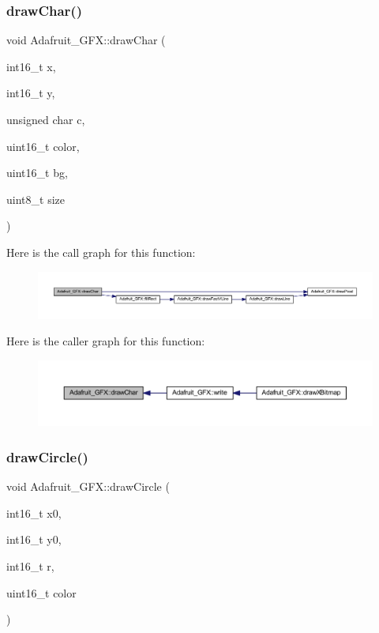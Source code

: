 \subsubsection{\texorpdfstring{draw\+Char()}{drawChar()}}
{\footnotesize\ttfamily void Adafruit\+\_\+\+G\+F\+X\+::draw\+Char (\begin{DoxyParamCaption}\item[{int16\+\_\+t}]{x,  }\item[{int16\+\_\+t}]{y,  }\item[{unsigned char}]{c,  }\item[{uint16\+\_\+t}]{color,  }\item[{uint16\+\_\+t}]{bg,  }\item[{uint8\+\_\+t}]{size }\end{DoxyParamCaption})}

Here is the call graph for this function\+:
\nopagebreak
\begin{figure}[H]
\begin{center}
\leavevmode
\includegraphics[width=350pt]{d9/d97/class_adafruit___g_f_x_ab7f5a29b3a3dffe30c6a3f4c1f604a5a_cgraph}
\end{center}
\end{figure}
Here is the caller graph for this function\+:
\nopagebreak
\begin{figure}[H]
\begin{center}
\leavevmode
\includegraphics[width=350pt]{d9/d97/class_adafruit___g_f_x_ab7f5a29b3a3dffe30c6a3f4c1f604a5a_icgraph}
\end{center}
\end{figure}
\mbox{\label{class_adafruit___g_f_x_a648d2d6765e488b4556e802167d885fb}} 
\subsubsection{\texorpdfstring{draw\+Circle()}{drawCircle()}}
{\footnotesize\ttfamily void Adafruit\+\_\+\+G\+F\+X\+::draw\+Circle (\begin{DoxyParamCaption}\item[{int16\+\_\+t}]{x0,  }\item[{int16\+\_\+t}]{y0,  }\item[{int16\+\_\+t}]{r,  }\item[{uint16\+\_\+t}]{color }\end{DoxyParamCaption})}

